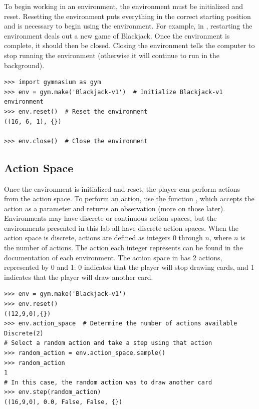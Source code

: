 To begin working in an environment, the environment must be initialized and reset.
Resetting the environment puts everything in the correct starting position and is necessary to begin using the environment.
For example, in , restarting the environment deals out a new game of Blackjack.
Once the environment is complete, it should then be closed.
Closing the environment tells the computer to stop running the environment (otherwise it will continue to run in the background).

\begin{lstlisting}
>>> import gymnasium as gym
>>> env = gym.make('Blackjack-v1')  # Initialize Blackjack-v1 environment
>>> env.reset()  # Reset the environment
((16, 6, 1), {})

>>> env.close()  # Close the environment
\end{lstlisting}

\subsection*{Action Space}
Once the environment is initialized and reset, the player can perform actions from the action space.
To perform an action, use the function , which accepts the action as a parameter and returns an observation (more on those later).
Environments may have discrete or continuous action spaces, but the environments presented in this lab all have discrete action spaces.
When the action space is discrete, actions are defined as integers 0 through $n$, where $n$ is the number of actions.
The action each integer represents can be found in the documentation of each environment.
The action space in  has 2 actions, represented by 0 and 1: 0 indicates that the player will stop drawing cards, and 1 indicates that the player will draw another card.

\begin{lstlisting}
>>> env = gym.make('Blackjack-v1')
>>> env.reset()
((12,9,0),{})
>>> env.action_space  # Determine the number of actions available
Discrete(2)
# Select a random action and take a step using that action
>>> random_action = env.action_space.sample()
>>> random_action 
1
# In this case, the random action was to draw another card
>>> env.step(random_action)
((16,9,0), 0.0, False, False, {})
\end{lstlisting}

